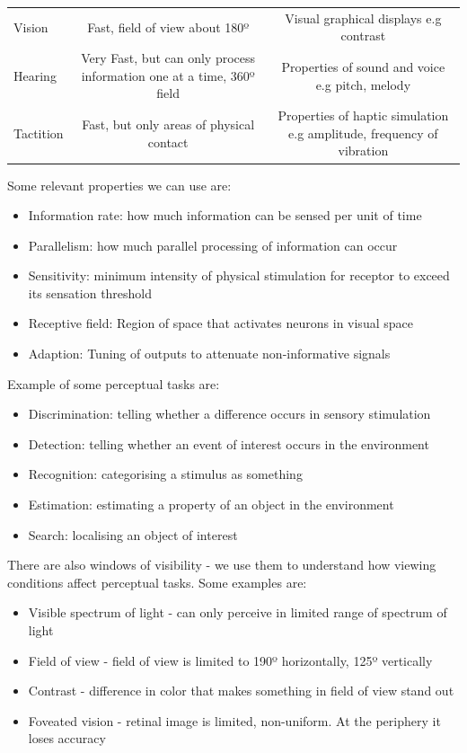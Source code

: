 \documentclass{article}
\begin{document}
\begin{center}
\begin{tabulary}{0.99\textwidth}{|p{3cm}|C|C|}
    \hline
{} &  &  \\ 
                    \hline
    Vision & Fast, field of view about 180º & Visual graphical displays e.g contrast \\ \hline
    Hearing & Very Fast, but can only process information one at a time, 360º field & Properties of sound and voice e.g pitch, melody \\ \hline
    Tactition & Fast, but only areas of physical contact & Properties of haptic simulation e.g amplitude, frequency of vibration \\ \hline
    \end{tabulary}
\end{center}
Some relevant properties we can use are:
\begin{itemize}
    \item Information rate: how much information can be sensed per unit of time
    \item Parallelism: how much parallel processing of information can occur 
    \item Sensitivity: minimum intensity of physical stimulation for receptor to exceed its sensation threshold
    \item Receptive field: Region of space that activates neurons in visual space
    \item Adaption: Tuning of outputs to attenuate non-informative signals
\end{itemize}
Example of some perceptual tasks are:
\begin{itemize}
    \item Discrimination: telling whether a difference occurs in sensory stimulation
    \item Detection: telling whether an event of interest occurs in the environment
    \item Recognition: categorising a stimulus as something
    \item Estimation: estimating a property of an object in the environment
    \item Search: localising an object of interest
\end{itemize}
There are also windows of visibility - we use them to understand how viewing conditions affect perceptual tasks. Some examples are:
\begin{itemize}
    \item Visible spectrum of light - can only perceive in limited range of spectrum of light
    \item Field of view - field of view is limited to 190º horizontally, 125º vertically 
    \item Contrast - difference in color that makes something in field of view stand out
    \item Foveated vision - retinal image is limited, non-uniform. At the periphery it loses accuracy
\end{itemize}
\end{document}
